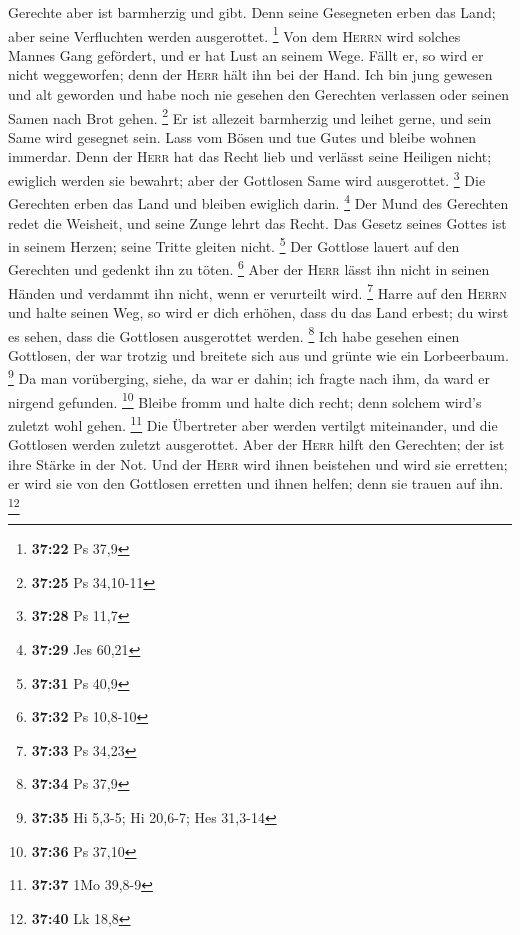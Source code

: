 Gerechte aber ist barmherzig und gibt.  Denn seine
Gesegneten erben das Land; aber seine Verfluchten werden ausgerottet.
\footnote{\textbf{37:22} Ps 37,9}  Von dem \textsc{Herrn}
wird solches Mannes Gang gefördert, und er hat Lust an seinem Wege.
 Fällt er, so wird er nicht weggeworfen; denn der
\textsc{Herr} hält ihn bei der Hand.  Ich bin jung
gewesen und alt geworden und habe noch nie gesehen den Gerechten
verlassen oder seinen Samen nach Brot gehen. \footnote{\textbf{37:25} Ps
  34,10-11}  Er ist allezeit barmherzig und leihet gerne,
und sein Same wird gesegnet sein.  Lass vom Bösen und tue
Gutes und bleibe wohnen immerdar.  Denn der \textsc{Herr}
hat das Recht lieb und verlässt seine Heiligen nicht; ewiglich werden
sie bewahrt; aber der Gottlosen Same wird ausgerottet. \footnote{\textbf{37:28}
  Ps 11,7}  Die Gerechten erben das Land und bleiben
ewiglich darin. \footnote{\textbf{37:29} Jes 60,21}  Der
Mund des Gerechten redet die Weisheit, und seine Zunge lehrt das Recht.
 Das Gesetz seines Gottes ist in seinem Herzen; seine
Tritte gleiten nicht. \footnote{\textbf{37:31} Ps 40,9} 
Der Gottlose lauert auf den Gerechten und gedenkt ihn zu töten.
\footnote{\textbf{37:32} Ps 10,8-10}  Aber der
\textsc{Herr} lässt ihn nicht in seinen Händen und verdammt ihn nicht,
wenn er verurteilt wird. \footnote{\textbf{37:33} Ps 34,23}
 Harre auf den \textsc{Herrn} und halte seinen Weg, so
wird er dich erhöhen, dass du das Land erbest; du wirst es sehen, dass
die Gottlosen ausgerottet werden. \footnote{\textbf{37:34} Ps 37,9}
 Ich habe gesehen einen Gottlosen, der war trotzig und
breitete sich aus und grünte wie ein Lorbeerbaum. \footnote{\textbf{37:35}
  Hi 5,3-5; Hi 20,6-7; Hes 31,3-14}  Da man vorüberging,
siehe, da war er dahin; ich fragte nach ihm, da ward er nirgend
gefunden. \footnote{\textbf{37:36} Ps 37,10}  Bleibe
fromm und halte dich recht; denn solchem wird's zuletzt wohl gehen.
\footnote{\textbf{37:37} 1Mo 39,8-9}  Die Übertreter aber
werden vertilgt miteinander, und die Gottlosen werden zuletzt
ausgerottet.  Aber der \textsc{Herr} hilft den Gerechten;
der ist ihre Stärke in der Not.  Und der \textsc{Herr}
wird ihnen beistehen und wird sie erretten; er wird sie von den
Gottlosen erretten und ihnen helfen; denn sie trauen auf ihn.
\footnote{\textbf{37:40} Lk 18,8}


